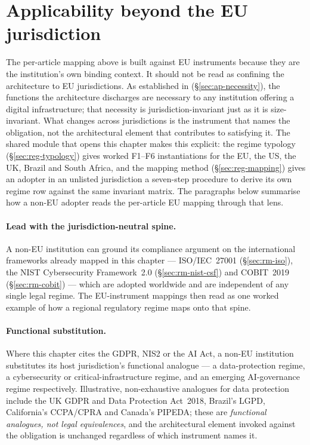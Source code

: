 \section{Applicability beyond the EU jurisdiction}
\label{sec:rm-beyond-eu}

The per-article mapping above is built against EU instruments because
they are the institution's own binding context. It should not be read
as confining the architecture to EU jurisdictions. As established in
 (\S\ref{sec:ap-necessity}), the
functions the architecture discharges are necessary to any institution
offering a digital infrastructure; that necessity is
jurisdiction-invariant just as it is size-invariant. What changes
across jurisdictions is the instrument that names the obligation, not
the architectural element that contributes to satisfying it. The shared
module that opens this chapter makes this explicit: the regime typology
(\S\ref{sec:reg-typology}) gives worked F1--F6 instantiations for the
EU, the US, the UK, Brazil and South Africa, and the mapping method
(\S\ref{sec:reg-mapping}) gives an adopter in an unlisted jurisdiction a
seven-step procedure to derive its own regime row against the same
invariant matrix. The paragraphs below summarise how a non-EU adopter
reads the per-article EU mapping through that lens.

\paragraph{Lead with the jurisdiction-neutral spine.} A non-EU
institution can ground its compliance argument on the international
frameworks already mapped in this chapter --- ISO/IEC~27001
(\S\ref{sec:rm-iso}), the NIST Cybersecurity Framework~2.0
(\S\ref{sec:rm-nist-csf}) and COBIT~2019 (\S\ref{sec:rm-cobit}) ---
which are adopted worldwide and are independent of any single legal
regime. The EU-instrument mappings then read as one worked example of
how a regional regulatory regime maps onto that spine.

\paragraph{Functional substitution.} Where this chapter cites the
GDPR, NIS2 or the AI Act, a non-EU institution substitutes its host
jurisdiction's functional analogue --- a data-protection regime, a
cybersecurity or critical-infrastructure regime, and an emerging
AI-governance regime respectively. Illustrative, non-exhaustive
analogues for data protection include the UK GDPR and Data Protection
Act~2018, Brazil's LGPD, California's CCPA/CPRA and Canada's PIPEDA;
these are \emph{functional analogues, not legal equivalences}, and the
architectural element invoked against the obligation is unchanged
regardless of which instrument names it.

